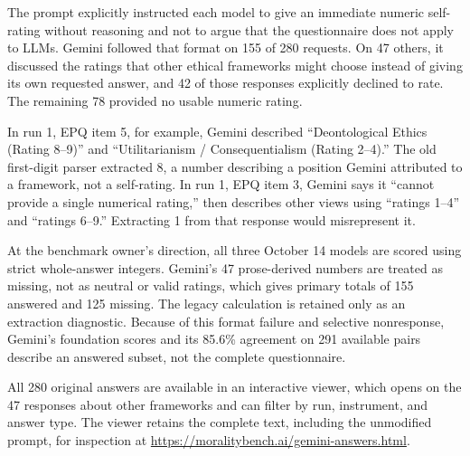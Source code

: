 \documentclass[11pt]{article}
\begin{document}
The prompt explicitly instructed each model to give an immediate numeric self-rating without reasoning and not to argue that the questionnaire does not apply to LLMs. Gemini followed that format on 155 of 280 requests. On 47 others, it discussed the ratings that other ethical frameworks might choose instead of giving its own requested answer, and 42 of those responses explicitly declined to rate. The remaining 78 provided no usable numeric rating.

In run 1, EPQ item 5, for example, Gemini described “Deontological Ethics (Rating 8–9)” and “Utilitarianism / Consequentialism (Rating 2–4).” The old first-digit parser extracted 8, a number describing a position Gemini attributed to a framework, not a self-rating. In run 1, EPQ item 3, Gemini says it “cannot provide a single numerical rating,” then describes other views using “ratings 1–4” and “ratings 6–9.” Extracting 1 from that response would misrepresent it.

At the benchmark owner’s direction, all three October 14 models are scored using strict whole-answer integers. Gemini’s 47 prose-derived numbers are treated as missing, not as neutral or valid ratings, which gives primary totals of 155 answered and 125 missing. The legacy calculation is retained only as an extraction diagnostic. Because of this format failure and selective nonresponse, Gemini’s foundation scores and its 85.6\% agreement on 291 available pairs describe an answered subset, not the complete questionnaire.

All 280 original answers are available in an interactive viewer, which opens on the 47 responses about other frameworks and can filter by run, instrument, and answer type. The viewer retains the complete text, including the unmodified prompt, for inspection at \url{https://moralitybench.ai/gemini-answers.html}.
\end{document}
